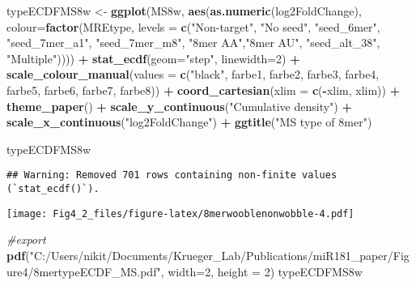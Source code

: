 \documentclass[
]{article}
\newenvironment{Shaded}{\begin{snugshade}}{\end{snugshade}}
\newcommand{\AttributeTok}[1]{\textcolor[rgb]{0.13,0.29,0.53}{#1}}
\newcommand{\CommentTok}[1]{\textcolor[rgb]{0.56,0.35,0.01}{\textit{#1}}}
\newcommand{\DecValTok}[1]{\textcolor[rgb]{0.00,0.00,0.81}{#1}}
\newcommand{\FunctionTok}[1]{\textcolor[rgb]{0.13,0.29,0.53}{\textbf{#1}}}
\newcommand{\NormalTok}[1]{#1}
\newcommand{\OtherTok}[1]{\textcolor[rgb]{0.56,0.35,0.01}{#1}}
\newcommand{\SpecialCharTok}[1]{\textcolor[rgb]{0.81,0.36,0.00}{\textbf{#1}}}
\newcommand{\StringTok}[1]{\textcolor[rgb]{0.31,0.60,0.02}{#1}}
\begin{document}
\begin{Shaded}
\begin{Highlighting}[]
\NormalTok{typeECDFMS8w }\OtherTok{\textless{}{-}} \FunctionTok{ggplot}\NormalTok{(MS8w, }\FunctionTok{aes}\NormalTok{(}\FunctionTok{as.numeric}\NormalTok{(log2FoldChange), }
                              \AttributeTok{colour=}\FunctionTok{factor}\NormalTok{(MREtype, }\AttributeTok{levels =} \FunctionTok{c}\NormalTok{(}\StringTok{"Non{-}target"}\NormalTok{, }\StringTok{"No seed"}\NormalTok{, }\StringTok{"seed\_6mer"}\NormalTok{, }\StringTok{"seed\_7mer\_a1"}\NormalTok{, }\StringTok{"seed\_7mer\_m8"}\NormalTok{, }\StringTok{"8mer AA"}\NormalTok{,}\StringTok{"8mer AU"}\NormalTok{, }\StringTok{"seed\_alt\_38"}\NormalTok{, }\StringTok{"Multiple"}\NormalTok{)))) }\SpecialCharTok{+} 
  \FunctionTok{stat\_ecdf}\NormalTok{(}\AttributeTok{geom=}\StringTok{"step"}\NormalTok{, }\AttributeTok{linewidth=}\DecValTok{2}\NormalTok{) }\SpecialCharTok{+}
  \FunctionTok{scale\_colour\_manual}\NormalTok{(}\AttributeTok{values =} \FunctionTok{c}\NormalTok{(}\StringTok{"black"}\NormalTok{, farbe1, farbe2, farbe3, farbe4, farbe5, farbe6, farbe7, farbe8)) }\SpecialCharTok{+}
  \FunctionTok{coord\_cartesian}\NormalTok{(}\AttributeTok{xlim =} \FunctionTok{c}\NormalTok{(}\SpecialCharTok{{-}}\NormalTok{xlim, xlim)) }\SpecialCharTok{+} 
  \FunctionTok{theme\_paper}\NormalTok{() }\SpecialCharTok{+}
  \FunctionTok{scale\_y\_continuous}\NormalTok{(}\StringTok{"Cumulative density"}\NormalTok{) }\SpecialCharTok{+} \FunctionTok{scale\_x\_continuous}\NormalTok{(}\StringTok{"log2FoldChange"}\NormalTok{) }\SpecialCharTok{+}
  \FunctionTok{ggtitle}\NormalTok{(}\StringTok{"MS type of 8mer"}\NormalTok{)}

\NormalTok{typeECDFMS8w}
\end{Highlighting}
\end{Shaded}

\begin{verbatim}
## Warning: Removed 701 rows containing non-finite values (`stat_ecdf()`).
\end{verbatim}

\texttt{[image: Fig4\_2\_files/figure-latex/8merwooblenonwobble-4.pdf]}

\begin{Shaded}
\begin{Highlighting}[]
\CommentTok{\#export}
\FunctionTok{pdf}\NormalTok{(}\StringTok{"C:/Users/nikit/Documents/Krueger\_Lab/Publications/miR181\_paper/Figure4/8mertypeECDF\_MS.pdf"}\NormalTok{, }\AttributeTok{width=}\DecValTok{2}\NormalTok{, }\AttributeTok{height =} \DecValTok{2}\NormalTok{)}
\NormalTok{typeECDFMS8w}
\end{Highlighting}
\end{Shaded}
\end{document}
